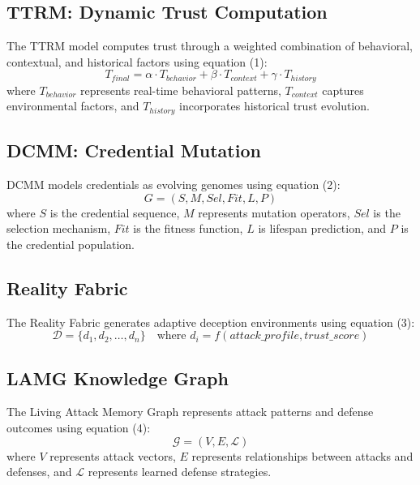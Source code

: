 \documentclass[12pt]{article}
\begin{document}
\subsection{TTRM: Dynamic Trust Computation}
The TTRM model computes trust through a weighted combination of behavioral, contextual, and historical factors using equation (1):
\begin{equation}
    T_{final} = \alpha \cdot T_{behavior} + \beta \cdot T_{context} + \gamma \cdot T_{history}
    \label{eq:trust}
\end{equation}
where \(T_{behavior}\) represents real-time behavioral patterns, \(T_{context}\) captures environmental factors, and \(T_{history}\) incorporates historical trust evolution.

\subsection{DCMM: Credential Mutation}
DCMM models credentials as evolving genomes using equation (2):
\begin{equation}
    G = (S, M, Sel, Fit, L, P)
    \label{eq:genome}
\end{equation}
where \(S\) is the credential sequence, \(M\) represents mutation operators, \(Sel\) is the selection mechanism, \(Fit\) is the fitness function, \(L\) is lifespan prediction, and \(P\) is the credential population.

\subsection{Reality Fabric}
The Reality Fabric generates adaptive deception environments using equation (3):
\begin{equation}
    \mathcal{D} = \{d_1, d_2, \ldots, d_n\} \quad \text{where } d_i = f(attack\_profile, trust\_score)
    \label{eq:deception}
\end{equation}

\subsection{LAMG Knowledge Graph}
The Living Attack Memory Graph represents attack patterns and defense outcomes using equation (4):
\begin{equation}
    \mathcal{G} = (V, E, \mathcal{L})
    \label{eq:graph}
\end{equation}
where \(V\) represents attack vectors, \(E\) represents relationships between attacks and defenses, and \(\mathcal{L}\) represents learned defense strategies.
\end{document}
